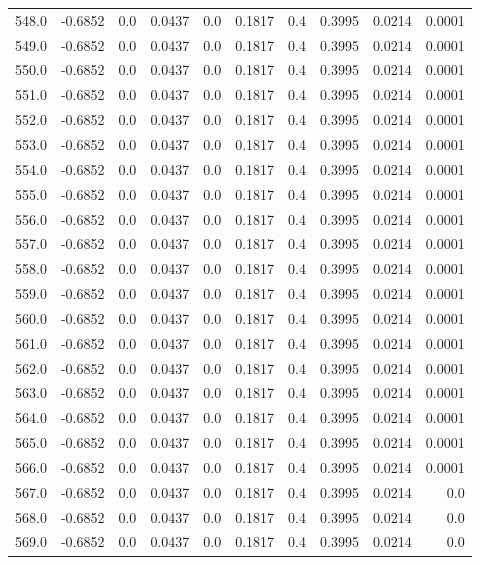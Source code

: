 \begin{longtable}{lrrrrrrrrr}
548.0 & -0.6852 & 0.0 & 0.0437 & 0.0 & 0.1817 & 0.4 & 0.3995 & 0.0214 & 0.0001 \\
549.0 & -0.6852 & 0.0 & 0.0437 & 0.0 & 0.1817 & 0.4 & 0.3995 & 0.0214 & 0.0001 \\
550.0 & -0.6852 & 0.0 & 0.0437 & 0.0 & 0.1817 & 0.4 & 0.3995 & 0.0214 & 0.0001 \\
551.0 & -0.6852 & 0.0 & 0.0437 & 0.0 & 0.1817 & 0.4 & 0.3995 & 0.0214 & 0.0001 \\
552.0 & -0.6852 & 0.0 & 0.0437 & 0.0 & 0.1817 & 0.4 & 0.3995 & 0.0214 & 0.0001 \\
553.0 & -0.6852 & 0.0 & 0.0437 & 0.0 & 0.1817 & 0.4 & 0.3995 & 0.0214 & 0.0001 \\
554.0 & -0.6852 & 0.0 & 0.0437 & 0.0 & 0.1817 & 0.4 & 0.3995 & 0.0214 & 0.0001 \\
555.0 & -0.6852 & 0.0 & 0.0437 & 0.0 & 0.1817 & 0.4 & 0.3995 & 0.0214 & 0.0001 \\
556.0 & -0.6852 & 0.0 & 0.0437 & 0.0 & 0.1817 & 0.4 & 0.3995 & 0.0214 & 0.0001 \\
557.0 & -0.6852 & 0.0 & 0.0437 & 0.0 & 0.1817 & 0.4 & 0.3995 & 0.0214 & 0.0001 \\
558.0 & -0.6852 & 0.0 & 0.0437 & 0.0 & 0.1817 & 0.4 & 0.3995 & 0.0214 & 0.0001 \\
559.0 & -0.6852 & 0.0 & 0.0437 & 0.0 & 0.1817 & 0.4 & 0.3995 & 0.0214 & 0.0001 \\
560.0 & -0.6852 & 0.0 & 0.0437 & 0.0 & 0.1817 & 0.4 & 0.3995 & 0.0214 & 0.0001 \\
561.0 & -0.6852 & 0.0 & 0.0437 & 0.0 & 0.1817 & 0.4 & 0.3995 & 0.0214 & 0.0001 \\
562.0 & -0.6852 & 0.0 & 0.0437 & 0.0 & 0.1817 & 0.4 & 0.3995 & 0.0214 & 0.0001 \\
563.0 & -0.6852 & 0.0 & 0.0437 & 0.0 & 0.1817 & 0.4 & 0.3995 & 0.0214 & 0.0001 \\
564.0 & -0.6852 & 0.0 & 0.0437 & 0.0 & 0.1817 & 0.4 & 0.3995 & 0.0214 & 0.0001 \\
565.0 & -0.6852 & 0.0 & 0.0437 & 0.0 & 0.1817 & 0.4 & 0.3995 & 0.0214 & 0.0001 \\
566.0 & -0.6852 & 0.0 & 0.0437 & 0.0 & 0.1817 & 0.4 & 0.3995 & 0.0214 & 0.0001 \\
567.0 & -0.6852 & 0.0 & 0.0437 & 0.0 & 0.1817 & 0.4 & 0.3995 & 0.0214 & 0.0 \\
568.0 & -0.6852 & 0.0 & 0.0437 & 0.0 & 0.1817 & 0.4 & 0.3995 & 0.0214 & 0.0 \\
569.0 & -0.6852 & 0.0 & 0.0437 & 0.0 & 0.1817 & 0.4 & 0.3995 & 0.0214 & 0.0 \\

\end{longtable}
